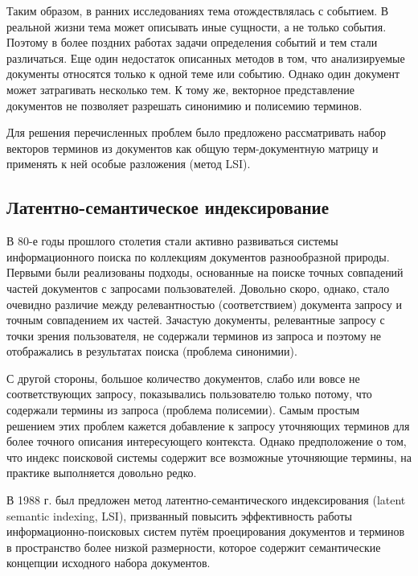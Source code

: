 Таким образом, в ранних исследованиях тема отождествлялась с событием. В реальной жизни тема может описывать иные сущности, а не только события. Поэтому в более поздних работах задачи определения событий и тем стали различаться. Еще один недостаток описанных методов в том, что анализируемые документы относятся только к одной теме или событию. Однако один документ может затрагивать несколько тем. К тому же, векторное представление документов не позволяет разрешать синонимию и полисемию терминов. 

Для решения перечисленных проблем было предложено рассматривать набор векторов терминов из документов как общую терм-документную матрицу и применять к ней особые разложения (метод LSI).


\subsection{Латентно-семантическое индексирование}

В 80-е годы прошлого столетия стали активно развиваться системы информационного поиска по коллекциям документов разнообразной природы. Первыми были реализованы подходы, основанные на поиске точных совпадений частей документов с запросами пользователей. Довольно скоро, однако, стало очевидно различие между релевантностью (соответствием) документа запросу и точным совпадением их частей. Зачастую документы, релевантные запросу с точки зрения пользователя, не содержали терминов из запроса и поэтому не отображались в результатах поиска (проблема синонимии). 

С другой стороны, большое количество документов, слабо или вовсе не соответствующих запросу, показывались пользователю только потому, что содержали термины из запроса (проблема полисемии). Самым простым решением этих проблем кажется добавление к запросу уточняющих терминов для более точного описания интересующего контекста. Однако предположение о том, что индекс поисковой системы содержит все возможные уточняющие термины, на практике выполняется довольно редко. 

В 1988 г. был предложен метод латентно-семантического индексирования (latent semantic indexing, LSI), призванный повысить эффективность работы информационно-поисковых систем путём проецирования документов и терминов в пространство более низкой размерности, которое содержит семантические концепции исходного набора документов. 

